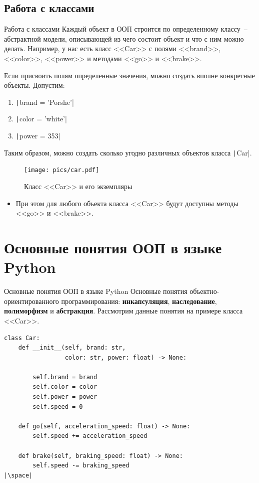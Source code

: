 \documentclass[aspectratio=169, mathserif]{beamer}	%
\begin{document}
\subsection{Работа с классами}
\begin{frame}[fragile]{Работа с классами}
\scriptsize
Каждый объект в ООП строится по определенному классу~-- абстрактной модели, описывающей из чего состоит объект и что с ним можно делать.
\vfill
Например, у нас есть класс <<Car>> с полями <<brand>>, <<color>>, <<power>> и методами <<go>> и <<brake>>.

Если присвоить полям определенные значения, можно создать вполне конкретные объекты.
\vfill
Допустим:
\begin{enumerate}
\item \texttt|brand = 'Porshe'|
\item \texttt|color = 'white'|
\item \texttt|power = 353|
\end{enumerate}
\vfill
Таким образом, можно создать сколько угодно различных объектов класса \texttt|Car|.
\vfill
\begin{figure}[h!]
\centering
\texttt{[image: pics/car.pdf]}
\caption{Класс <<Car>> и его экземпляры}
\end{figure}
\begin{itemize}
\item При этом для любого объекта класса <<Car>> будут доступны методы <<go>> и <<brake>>.
\end{itemize}
\vfill
\end{frame}


\section{Основные понятия ООП в языке Python}
\sectionframe

\begin{frame}[fragile]{Основные понятия ООП в языке Python}
\scriptsize
Основные понятия объектно-ориентированного программирования: \textcolor{tpugreen}{\textbf{инкапсуляция}}, \textbf{наследование}, \textcolor{tpugreen}{\textbf{полиморфизм}} и \textbf{абстракция}.
Рассмотрим данные понятия на примере класса <<Car>>.
\vfill
\begin{verbatim}
class Car:
    def __init__(self, brand: str,
                 color: str, power: float) -> None:

        self.brand = brand
        self.color = color
        self.power = power
        self.speed = 0

    def go(self, acceleration_speed: float) -> None:
        self.speed += acceleration_speed

    def brake(self, braking_speed: float) -> None:
        self.speed -= braking_speed
|\space|
\end{verbatim}
\vfill
\end{frame}
\end{document}
